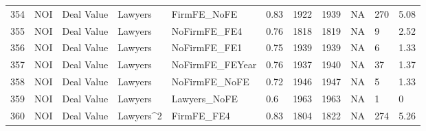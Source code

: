 \begin{table}[ht]
\begin{tabular}{rllllllllll}
  354 & NOI & Deal Value & Lawyers & FirmFE\_NoFE & 0.83 & 1922 & 1939 & NA & 270 & 5.08 \\ 
  355 & NOI & Deal Value & Lawyers & NoFirmFE\_FE4 & 0.76 & 1818 & 1819 & NA & 9 & 2.52 \\ 
  356 & NOI & Deal Value & Lawyers & NoFirmFE\_FE1 & 0.75 & 1939 & 1939 & NA & 6 & 1.33 \\ 
  357 & NOI & Deal Value & Lawyers & NoFirmFE\_FEYear & 0.76 & 1937 & 1940 & NA & 37 & 1.37 \\ 
  358 & NOI & Deal Value & Lawyers & NoFirmFE\_NoFE & 0.72 & 1946 & 1947 & NA & 5 & 1.33 \\ 
  359 & NOI & Deal Value & Lawyers & Lawyers\_NoFE & 0.6 & 1963 & 1963 & NA & 1 & 0 \\ 
  360 & NOI & Deal Value & Lawyers^2 & FirmFE\_FE4 & 0.83 & 1804 & 1822 & NA & 274 & 5.26 \\ 
   \hline
\end{tabular}
\end{table}
